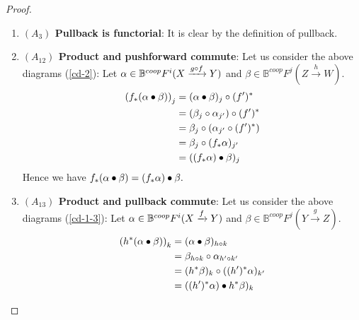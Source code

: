 \documentclass[a4paper]{amsart}
\begin{document}
\begin{proof}
\begin{enumerate}
\begin{equation}
Z'  @> {j'} >> Z \\
@V {g'}VV @VV {g}V \\
W'  @>> {j} > W 
\endCD 
\end{equation}
Then by the definition we have
\begin{align*}
((g\circ f)_*c)_j & := c_j \circ (g'\circ f')^* , \quad c_j \in F^m(X') \to F^{m+i}(W') \\
                  & = c_j \circ ((f')^* \circ (g')^*) \\
                  & = (c_j \circ (f')^*) \circ (g')^*\\ 
                  & = (f_*c)_j \circ (g')^*\\  
                  & = (g_*(f_*c))_j \\
                  & = ((g_* \circ f_*)c)_j: F^m(Z') \to  F^{m+i}(W')          
\end{align*}
Therefore $(g\circ f)_* c= (g_* \circ f_*)c \in \mathbb B^{coop}F^i(Z \xrightarrow g W).$
\item {\bf $(A_3)$ Pullback is functorial}: It is clear by the definition of pullback.
\item {\bf $(A_{12})$ Product and pushforward commute}: Let us consider the above diagrams (\ref{cd-2}): Let $\alpha \in 
\mathbb B^{coop}F^i(X \xrightarrow {g \circ f} Y)$ and $\beta \in \mathbb B^{coop}F^j(Z \xrightarrow h W).$
\begin{align*}
\left ( f_*(\alpha \bullet \beta)\right)_j & = (\alpha \bullet \beta)_j \circ (f')^*\\
& = (\beta_j \circ \alpha_{j'} ) \circ (f')^*\\
& = \beta_j \circ (\alpha_{j'} \circ (f')^*)\\
& = \beta_j \circ (f_*\alpha)_{j'}\\
& = ((f_*\alpha) \bullet \beta)_j
\end{align*}
Hence we have $f_*(\alpha \bullet \beta) = (f_*\alpha) \bullet \beta.$
\item {\bf $(A_{13})$ Product and pullback commute}: Let us consider the above diagrams (\ref{cd-1-3}): Let $\alpha \in 
\mathbb B^{coop}F^i(X \xrightarrow f Y)$ and $\beta \in \mathbb B^{coop}F^j(Y \xrightarrow g Z).$
\begin{align*}
\left ( h^*(\alp \bullet \beta)\right)_k & = (\alp \bullet \beta)_{h \circ k}\\
& = \beta_{h \circ k} \circ \alp_{h' \circ k'}\\
& = (h^*\beta)_k \circ ((h')^*\alp)_{k'}\\
& = ((h')^*\alp) \bullet h^*\beta)_k

\end{align*}
\end{enumerate}
\end{proof}
\end{document}
